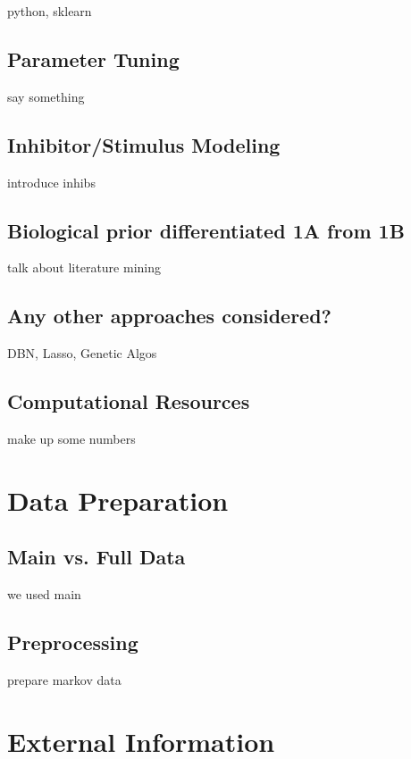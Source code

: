 \documentclass[letterpaper, 11pt]{article}
\begin{document}
python, sklearn

\subsection{Parameter Tuning}

say something

\subsection{Inhibitor/Stimulus Modeling}

introduce inhibs

\subsection{Biological prior differentiated 1A from 1B}

talk about literature mining

\subsection{Any other approaches considered?}

DBN, Lasso, Genetic Algos

\subsection{Computational Resources}

make up some numbers

\section{Data Preparation}

\subsection{Main vs. Full Data}

we used main

\subsection{Preprocessing}

prepare markov data

\section{External Information}
\end{document}
